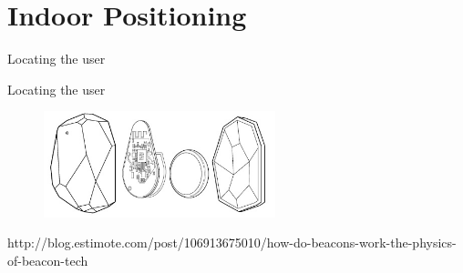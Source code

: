 \section{Indoor Positioning}

\begin{frame}{Locating the user}{}
\centering
\begin{figure}[!htb]%
\label{fig:prototype3-room-screenshot}
\end{figure}
\end{frame}

\begin{frame}{Locating the user}{}
	\centering
\begin{figure}[!htb]
  \includegraphics[width=0.6\textwidth]{../images/estimotebeacon}
\end{figure}
{\tiny http://blog.estimote.com/post/106913675010/how-do-beacons-work-the-physics-of-beacon-tech}
\end{frame}